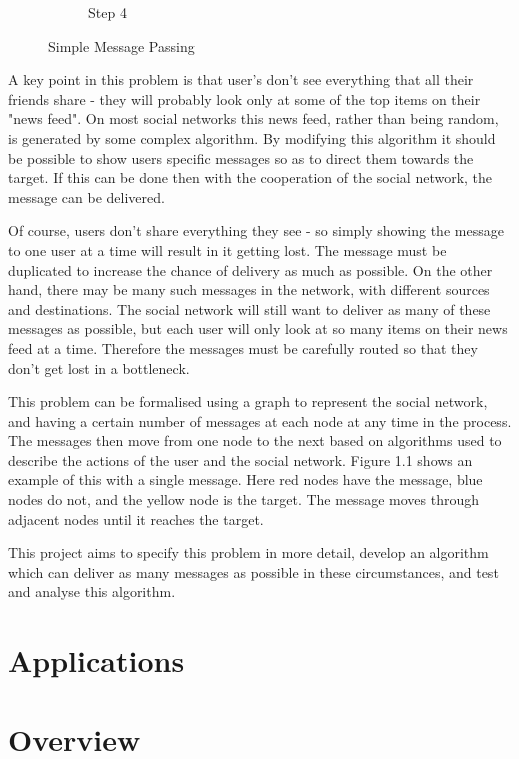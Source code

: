 \documentclass[bsc,frontabs,twoside,singlespacing,parskip,deptreport]{infthesis}     %
\begin{document}
\begin{figure}
\begin{subfigure}[b]{0.23\textwidth}
        \caption{Step 4}
        \label{fig:simpleProcess4}
    \end{subfigure}
  	\vspace{-5pt}
    \caption{Simple Message Passing}\label{fig:simpleProcess}
  	\vspace{-15pt}
\end{figure}

A key point in this problem is that user's don't see everything that all their friends share - they will probably look only at some of the top items on their "news feed". On most social networks this news feed, rather than being random, is generated by some complex algorithm. By modifying this algorithm it should be possible to show users specific messages so as to direct them towards the target. If this can be done then with the cooperation of the social network, the message can be delivered.

Of course, users don't share everything they see - so simply showing the message to one user at a time will result in it getting lost. The message must be duplicated to increase the chance of delivery as much as possible. On the other hand, there may be many such messages in the network, with different sources and destinations. The social network will still want to deliver as many of these messages as possible, but each user will only look at so many items on their news feed at a time. Therefore the messages must be carefully routed so that they don't get lost in a bottleneck.

This problem can be formalised using a graph to represent the social network, and having a certain number of messages at each node at any time in the process. The messages then move from one node to the next based on algorithms used to describe the actions of the user and the social network. Figure 1.1 shows an example of this with a single message. Here red nodes have the message, blue nodes do not, and the yellow node is the target. The message moves through adjacent nodes until it reaches the target.

This project aims to specify this problem in more detail, develop an algorithm which can deliver as many messages as possible in these circumstances, and test and analyse this algorithm.

\section{Applications}


\section{Overview}
\end{document}
